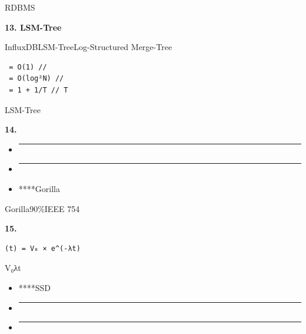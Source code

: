 RDBMS

\textbf{13. LSM-Tree}

InfluxDBLSM-TreeLog-Structured Merge-Tree

\begin{verbatim}
 = O(1) // 
 = O(log²N) // 
 = 1 + 1/T // T
\end{verbatim}

LSM-Tree

\textbf{14. }

\begin{itemize}
\item
  \begin{center}\rule{0.5\linewidth}{0.5pt}\end{center}
\item
  \begin{center}\rule{0.5\linewidth}{0.5pt}\end{center}
\item
  ****Gorilla
\end{itemize}

Gorilla90\%IEEE 754

\textbf{15. }

\begin{verbatim}
(t) = V₀ × e^(-λt)
\end{verbatim}

V₀λt

\begin{itemize}
\item
  ****SSD
\item
  \begin{center}\rule{0.5\linewidth}{0.5pt}\end{center}
\item
  \begin{center}\rule{0.5\linewidth}{0.5pt}\end{center}
\end{itemize}

\subsubsection{}\label{section-42}

